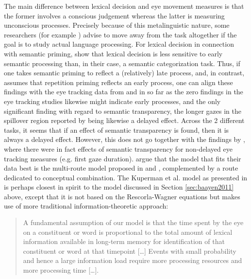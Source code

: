 The main difference between lexical decision and eye movement measures
is that the former involves a conscious judgement whereas the latter
is measuring unconscious processes. 
Precisely because of this metalinguistic nature, some researchers
(for example \citealt{Baayen:2014}) advise to move away from the  task altogether if the goal is to study actual language
processing. For lexical decision in connection with semantic priming,
\citet{BuenoandFrenck-Mestre:2008} show that lexical decision is less
sensitive to early semantic processing than, in their case, a semantic
categorization task. Thus, if one takes semantic priming to reflect a
(relatively) late process, and, in contrast, assumes that repetition priming
reflects an early process, one can align these findings with the
eye tracking data from \citet{PollatsekandHyona:2005} and
\citet{Frissonetal:2008} in so far as the zero findings in the eye
tracking studies likewise might indicate early processes, and the only
significant finding with regard to semantic transparency, the longer
gazes in the spillover region reported by \citet{Frissonetal:2008}
being likewise a delayed effect. Across the 2 different tasks, it seems
 that if an effect of semantic
transparency is found, then it is always a delayed effect. However, this does
not go together with the findings by \citet{MarelliandLuzzatti:2012},
where there were in fact effects of semantic transparency for
non-delayed eye
tracking measures (e.g. first gaze
duration). \citet[662--663]{MarelliandLuzzatti:2012} argue that the model
that fits their data best is the multi-route model proposed in
\citet{Kupermanetal:2008} and \citet{Kupermanetal:2009}, complemented
by a route dedicated to conceptual combination.  The Kuperman et al. model as
presented in \citet{Kupermanetal:2009} is perhaps closest in spirit
to the \citet{Baayenetal:2011} model discussed in Section \ref{sec:baayen2011} above, except that it is not
based on the Rescorla-Wagner equations but makes use of more
traditional information-theoretic approach:
\begin{quotation}
A fundamental assumption of our model is that the time spent by the eye on a
constituent   or   word   is   proportional   to   the   total   amount   of   lexical
information   available   in   long-term   memory   for   identification   of   that
constituent  or  word  at  that  timepoint [\dots]
Events with small probability and hence a large
information  load  require  more  processing  resources  and  more  processing
time [\dots]. \citep[1112]{Kupermanetal:2009}
  \end{quotation}
